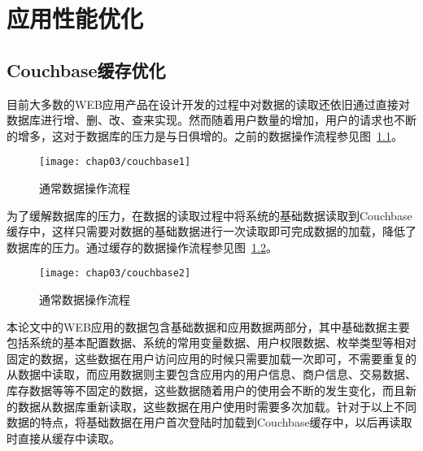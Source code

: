 \chapter{应用性能优化}
\label{cha:ApplicationOptimization}
\section{Couchbase缓存优化}
目前大多数的WEB应用产品在设计开发的过程中对数据的读取还依旧通过直接对数据库进行增、删、改、查来实现。然而随着用户数量的增加，用户的请求也不断的增多，这对于数据库的压力是与日俱增的。之前的数据操作流程参见图~\ref{fig:couchbase1}。
\begin{figure}[H] %
  \centering
  \texttt{[image: chap03/couchbase1]}
  \caption{通常数据操作流程}
  \label{fig:couchbase1}
\end{figure}
为了缓解数据库的压力，在数据的读取过程中将系统的基础数据读取到Couchbase缓存中，这样只需要对数据的基础数据进行一次读取即可完成数据的加载，降低了数据库的压力。通过缓存的数据操作流程参见图~\ref{fig:couchbase2}。
\begin{figure}[H] %
  \centering
  \texttt{[image: chap03/couchbase2]}
  \caption{通常数据操作流程}
  \label{fig:couchbase2}
\end{figure}
本论文中的WEB应用的数据包含基础数据和应用数据两部分，其中基础数据主要包括系统的基本配置数据、系统的常用变量数据、用户权限数据、枚举类型等相对固定的数据，这些数据在用户访问应用的时候只需要加载一次即可，不需要重复的从数据中读取，而应用数据则主要包含应用内的用户信息、商户信息、交易数据、库存数据等等不固定的数据，这些数据随着用户的使用会不断的发生变化，而且新的数据从数据库重新读取，这些数据在用户使用时需要多次加载。针对于以上不同数据的特点，将基础数据在用户首次登陆时加载到Couchbase缓存中，以后再读取时直接从缓存中读取。


